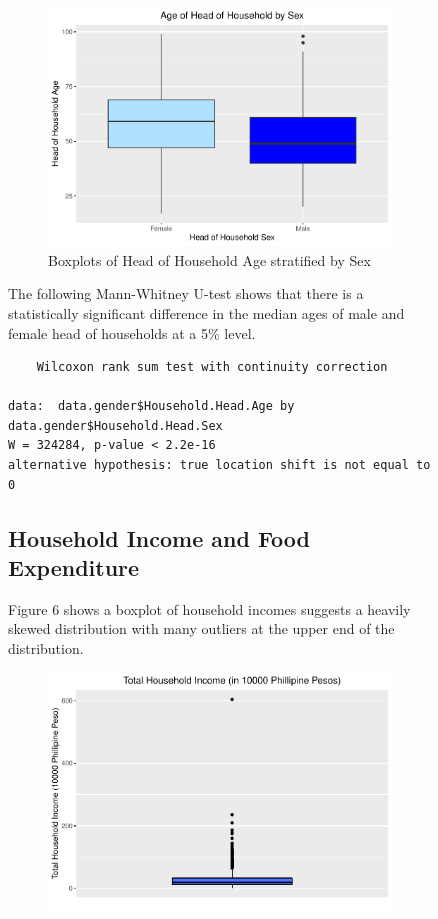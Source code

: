 \documentclass[
]{article}
\begin{document}
\begin{figure}[H]
\begin{figure}

{\centering \includegraphics[width=0.8\linewidth]{Group_01_Project2_demo_files/figure-latex/boxplot of age by gender-1} 

}

\caption{Boxplots of Head of Household Age stratified by Sex}\label{fig:boxplot of age by gender}
\end{figure}

The following Mann-Whitney U-test shows that there is a statistically
significant difference in the median ages of male and female head of
households at a 5\% level.

\begin{verbatim}
    Wilcoxon rank sum test with continuity correction

data:  data.gender$Household.Head.Age by data.gender$Household.Head.Sex
W = 324284, p-value < 2.2e-16
alternative hypothesis: true location shift is not equal to 0
\end{verbatim}

\hypertarget{household-income-and-food-expenditure}{%
\subsection{Household Income and Food
Expenditure}\label{household-income-and-food-expenditure}}

Figure 6 shows a boxplot of household incomes suggests a heavily skewed
distribution with many outliers at the upper end of the distribution.

\begin{figure}[H]

{\centering \includegraphics[width=0.8\linewidth]{Group_01_Project2_demo_files/figure-latex/balance boxplot-1} 

}
\end{figure}
\end{figure}
\end{document}
